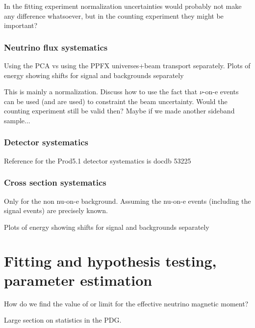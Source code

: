 In the fitting experiment normalization uncertainties would probably not make any difference whatsoever, but in the counting experiment they might be important?

\subsubsection*{Neutrino flux systematics}
Using the PCA vs using the PPFX universes+beam transport separately. Plots of energy showing shifts for signal and backgrounds separately


This is mainly a normalization. Discuss how to use the fact that $\nu$-on-e events can be used (and are used) to constraint the beam uncertainty. Would the counting experiment still be valid then? Maybe if we made another sideband sample...

\subsubsection*{Detector systematics}
Reference for the Prod5.1 detector systematics is docdb 53225

\subsubsection*{Cross section systematics}
Only for the non nu-on-e background. Assuming the nu-on-e events (including the signal events) are precisely known.

Plots of energy showing shifts for signal and backgrounds separately
\fi


\section{Fitting and hypothesis testing, parameter estimation}
\iffalse
How do we find the value of or limit for the effective neutrino magnetic moment?

Large section on statistics in the PDG.


